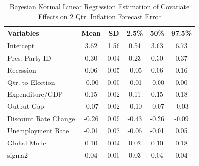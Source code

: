 \documentclass[a4paper]{article}\usepackage[]{graphicx}\usepackage[]{color}
\begin{document}
\begin{table}[ht]
\centering
\caption{Bayesian Normal Linear Regression Estimation of Covariate Effects on 2 Qtr. Inflation Forecast Error} 
\label{OutputNB}
{\small
\begin{tabular}{lccccc}
  \hline
Variables & Mean & SD & 2.5\% & 50\% & 97.5\% \\ 
  \hline
Intercept & 3.62 & 1.56 & 0.54 & 3.63 & 6.73 \\ 
  Pres. Party ID & 0.30 & 0.04 & 0.23 & 0.30 & 0.37 \\ 
  Recession & 0.06 & 0.05 & -0.05 & 0.06 & 0.16 \\ 
  Qtr. to Election & -0.00 & 0.00 & -0.01 & -0.00 & 0.00 \\ 
  Expenditure/GDP & 0.15 & 0.02 & 0.11 & 0.15 & 0.18 \\ 
  Output Gap & -0.07 & 0.02 & -0.10 & -0.07 & -0.03 \\ 
  Discount Rate Change & -0.26 & 0.09 & -0.43 & -0.26 & -0.09 \\ 
  Unemployment Rate & -0.01 & 0.03 & -0.06 & -0.01 & 0.05 \\ 
  Global Model & 0.10 & 0.04 & 0.02 & 0.10 & 0.18 \\ 
  sigma2 & 0.04 & 0.00 & 0.03 & 0.04 & 0.04 \\ 
   \hline
\end{tabular}
}
\end{table}




\end{document}

